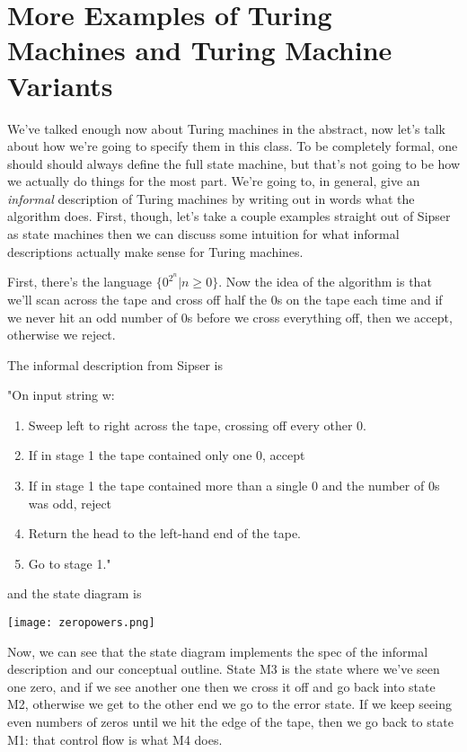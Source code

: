\documentclass[11pt]{article}
\begin{document}
\section{More Examples of Turing Machines and Turing Machine Variants}
\label{sec-11}
We've talked enough now about Turing machines in the abstract, now let's talk about how we're going to specify them in this class. To be completely formal, one should should always define the full state machine, but that's not going to be how we actually do things for the most part. We're going to, in general, give an \emph{informal} description of Turing machines by writing out in words what the algorithm does. First, though, let's take a couple examples straight out of Sipser as state machines then we can discuss some intuition for what informal descriptions actually make sense for Turing machines. 

First, there's the language $\{0^{2^n} | n \ge 0\}$. Now the idea of the algorithm is that we'll scan across the tape and cross off half the 0s on the tape each time and if we never hit an odd number of 0s before we cross everything off, then we accept, otherwise we reject.

The informal description from Sipser is

"On input string w: 
\begin{enumerate}
\item Sweep left to right across the tape, crossing off every other 0.
\item If in stage 1 the tape contained only one 0, accept
\item If in stage 1 the tape contained more than a single 0 and the number of 0s was odd, reject
\item Return the head to the left-hand end of the tape.
\item Go to stage 1."
\end{enumerate}

and the state diagram is 

\texttt{[image: zeropowers.png]}


Now, we can see that the state diagram implements the spec of the informal description and our conceptual outline. State M3 is the state where we've seen one zero, and if we see another one then we cross it off and go back into state M2, otherwise we get to the other end we go to the error state. If we keep seeing even numbers of zeros until we hit the edge of the tape, then we go back to state M1: that control flow is what M4 does.
\end{document}

